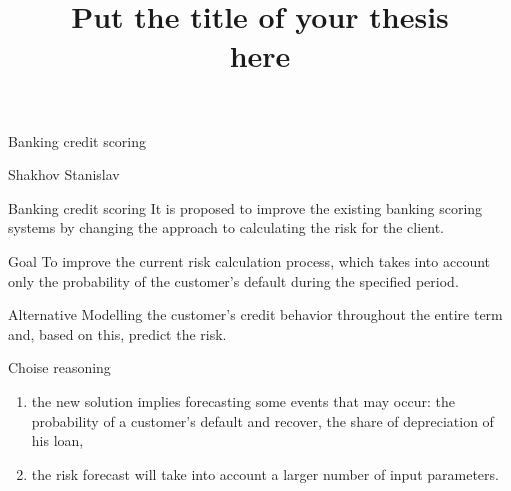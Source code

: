 \documentclass[12pt,pdf,hyperref={unicode}]{beamer}
\title{ Put the title of your thesis \\ here}
\begin{document}
\setcounter{page}{1}%
\begin{frame}{Banking credit scoring}
\begin{block}{Shakhov Stanislav}
\end{block}
\end{frame}
\begin{frame}{Banking credit scoring}
It is proposed to improve the existing banking scoring systems by changing the approach to calculating the risk for the client. 

\begin{block}{Goal}
To improve the current risk calculation process, which takes into account only the probability of the customer's default during the specified period. 
\end{block}
\begin{block}{Alternative}
Modelling the customer's credit behavior throughout the entire term and, based on this, predict the risk.
\end{block}
\begin{block}{Choise reasoning} 
\begin{enumerate}[1)]
\item the new solution implies forecasting some events that may occur: the probability of a customer's default and recover, the share of depreciation of his loan, 
\item the risk forecast will take into account a larger number of input parameters.

\end{enumerate}
\end{block}
\end{frame}
\end{document}
